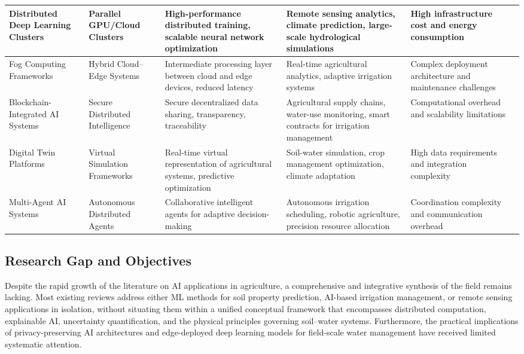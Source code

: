 \documentclass[land,article,submit,pdftex,moreauthors]{Definitions/mdpi}
\numberwithin{equation}{section}
\begin{document}
\begin{longtable}{p{1.4cm} p{1.4cm} p{3.2cm} p{3.2cm} p{2.4cm} p{1.6cm}}
Distributed Deep Learning Clusters &
Parallel GPU/Cloud Clusters &
High-performance distributed training, scalable neural network optimization &
Remote sensing analytics, climate prediction, large-scale hydrological simulations &
High infrastructure cost and energy consumption &
\citep{Dean2012, Verbraeken2020} \\ \hline

Fog Computing Frameworks &
Hybrid Cloud--Edge Systems &
Intermediate processing layer between cloud and edge devices, reduced latency &
Real-time agricultural analytics, adaptive irrigation systems &
Complex deployment architecture and maintenance challenges &
\citep{Bonomi2012, s21175922, Guardo} \\ \hline

Blockchain-Integrated AI Systems &
Secure Distributed Intelligence &
Secure decentralized data sharing, transparency, traceability &
Agricultural supply chains, water-use monitoring, smart contracts for irrigation management &
Computational overhead and scalability limitations &
\citep{Ferrag2020, nayak2025blockchain, Casino2019, Reyna2018} \\ \hline

Digital Twin Platforms &
Virtual Simulation Frameworks &
Real-time virtual representation of agricultural systems, predictive optimization &
Soil-water simulation, crop management optimization, climate adaptation &
High data requirements and integration complexity &
\citep{Pylianidis2021, Verdouw2021, ALVES2023135920} \\ \hline

Multi-Agent AI Systems &
Autonomous Distributed Agents &
Collaborative intelligent agents for adaptive decision-making &
Autonomous irrigation scheduling, robotic agriculture, precision resource allocation &
Coordination complexity and communication overhead &
\citep{Wooldridge2009, su17125423, Chlingaryan2018} \\

\end{longtable}
\normalsize

\subsection{Research Gap and Objectives}

Despite the rapid growth of the literature on AI applications in agriculture, a comprehensive and integrative synthesis of the field remains lacking. Most existing reviews address either ML methods for soil property prediction, AI-based irrigation management, or remote sensing applications in isolation, without situating them within a unified conceptual framework that encompasses distributed computation, explainable AI, uncertainty quantification, and the physical principles governing soil--water systems. Furthermore, the practical implications of privacy-preserving AI architectures and edge-deployed deep learning models for field-scale water management have received limited systematic attention.
\end{document}
